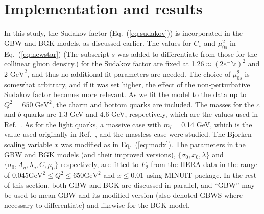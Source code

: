 \documentclass[11pt]{article}
\newcommand{\pairdot}[2]{ \mathbf{#1}\cdot\mathbf{#2}  }
\begin{document}


\section{Implementation and results}
In this study, the Sudakov factor (Eq.~(\ref{eq:sudakov})) is incorporated in the GBW and BGK models, as discussed earlier. %
The values for $C_s$ and $\mu_{0s}^2$ in Eq.~(\ref{eq:newstar}) (The subscript $s$ was added to differentiate from those for the collinear gluon density.) for the Sudakov factor are fixed at 1.26$\approx (2e^{-\gamma_E})^2$ and 2 $\mathrm{GeV^2}$, 
and thus no additional fit parameters are needed. The choice of $\mu_{0s}^2$  is somewhat arbitrary, and if it was set higher, the effect of the non-perturbative Sudakov factor becomes more relevant. 
As we fit the model to the data up to $Q^2=650\;\mathrm{GeV^2}$, the charm and bottom quarks are included.  
The masses for the $c$ and $b$ quarks are 1.3 GeV and 4.6 GeV, respectively, which are the values used in Ref.~\cite{gbs2018}. As for the light quarks, a massive case with $m_l=$0.14 GeV, which is the value used originally in Ref.~\cite{gbw1998}, and the massless case were studied.  The Bjorken scaling variable $x$ was modified as in Eq.~(\ref{eq:modx}). %
The parameters in the GBW and BGK models (and their improved versions), $\{\sigma_0, x_0, \lambda\}$ and  $\{\sigma_0, A_g, \lambda_g, C, \mu_0\}$ respectively, are fitted to $F_2$ from the HERA data\cite{hera} in the range of $0.045\mathrm{GeV^2} \leq Q^2\leq 650 \mathrm{GeV^2}$ and $x \leq0.01$ using MINUIT\cite{minuit} package. %
In the rest of this section, both GBW and BGK are discussed in parallel, and ``GBW'' may be used to mean GBW and its modified version (also denoted GBWS where necessary to differentiate) and likewise for the BGK model.
\end{document}
